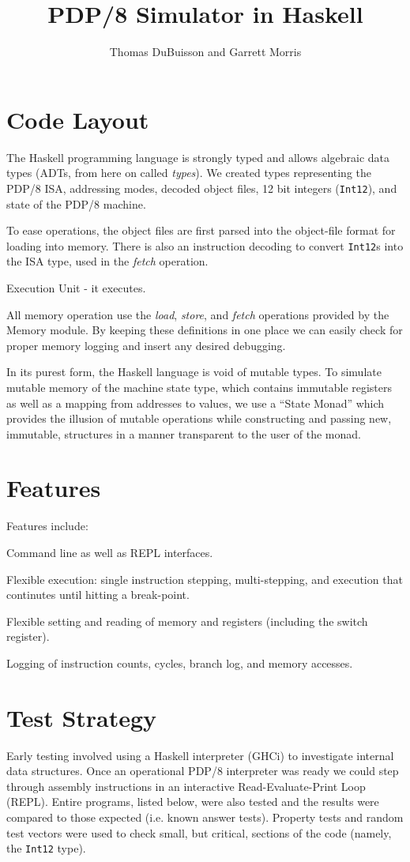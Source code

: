 \documentclass[11pt]{exam}
\title{PDP/8 Simulator in Haskell}
\author{Thomas DuBuisson and Garrett Morris}
\def\Int{\texttt{Int12}}
\begin{document}
\maketitle

\section{Code Layout}
The Haskell programming language is strongly typed and allows
algebraic data types (ADTs, from here on called {\em types}).  We
created types representing the PDP/8 ISA, addressing modes, decoded
object files, 12 bit integers (\Int{}), and state of the PDP/8 machine.

To ease operations, the object files are first parsed into the object-file
format for loading into memory.  There is also an instruction decoding to
convert \Int{}s into the ISA type, used in the {\em fetch} operation.

Execution Unit - it executes.

All memory operation use the {\em load}, {\em store}, and {\em fetch} operations
provided by the Memory module.  By keeping these definitions in one place we can
easily check for proper memory logging and insert any desired debugging.

In its purest form, the Haskell language is void of mutable types.  To
simulate mutable memory of the machine state type, which contains
immutable registers as well as a mapping from addresses to values, we
use a ``State Monad'' which provides the illusion of mutable
operations while constructing and passing new, immutable, structures in
a manner transparent to the user of the monad.

\section{Features}
Features include:
{\small
\begin{itemize*}
\item Command line as well as REPL interfaces.
\item Flexible execution: single instruction stepping, multi-stepping, and execution that continutes until hitting a break-point.
\item Flexible setting and reading of memory and registers (including the switch register).
\item Logging of instruction counts, cycles, branch log, and memory accesses.
\end{itemize*}
}
\section{Test Strategy}
Early testing involved using a Haskell interpreter (GHCi) to
investigate internal data structures.  Once an operational PDP/8
interpreter was ready we could step through assembly instructions in
an interactive Read-Evaluate-Print Loop (REPL).  Entire programs,
listed below, were also tested and the results were compared to those
expected (i.e. known answer tests).  Property tests and random test
vectors were used to check small, but critical, sections of the code
(namely, the \Int{} type).
\end{document}
